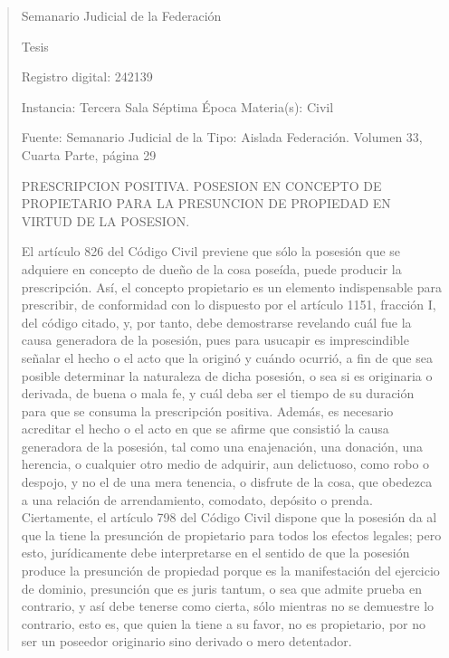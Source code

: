 \documentclass[11pt,a4paper]{article}
\begin{document}
\begin{quote}
                                                   Semanario Judicial de la Federación

                                                  Tesis

 Registro digital: 242139

 Instancia: Tercera Sala          Séptima Época                        Materia(s): Civil

                                  Fuente: Semanario Judicial de la     Tipo: Aislada
                                  Federación.
                                  Volumen 33, Cuarta Parte, página
                                  29


PRESCRIPCION POSITIVA. POSESION EN CONCEPTO DE PROPIETARIO PARA LA
PRESUNCION DE PROPIEDAD EN VIRTUD DE LA POSESION.


El artículo 826 del Código Civil previene que sólo la posesión que se adquiere en concepto de
dueño de la cosa poseída, puede producir la prescripción. Así, el concepto propietario es un
elemento indispensable para prescribir, de conformidad con lo dispuesto por el artículo 1151,
fracción I, del código citado, y, por tanto, debe demostrarse revelando cuál fue la causa generadora
de la posesión, pues para usucapir es imprescindible señalar el hecho o el acto que la originó y
cuándo ocurrió, a fin de que sea posible determinar la naturaleza de dicha posesión, o sea si es
originaria o derivada, de buena o mala fe, y cuál deba ser el tiempo de su duración para que se
consuma la prescripción positiva. Además, es necesario acreditar el hecho o el acto en que se
afirme que consistió la causa generadora de la posesión, tal como una enajenación, una donación,
una herencia, o cualquier otro medio de adquirir, aun delictuoso, como robo o despojo, y no el de
una mera tenencia, o disfrute de la cosa, que obedezca a una relación de arrendamiento, comodato,
depósito o prenda. Ciertamente, el artículo 798 del Código Civil dispone que la posesión da al que la
tiene la presunción de propietario para todos los efectos legales; pero esto, jurídicamente debe
interpretarse en el sentido de que la posesión produce la presunción de propiedad porque es la
manifestación del ejercicio de dominio, presunción que es juris tantum, o sea que admite prueba en
contrario, y así debe tenerse como cierta, sólo mientras no se demuestre lo contrario, esto es, que
quien la tiene a su favor, no es propietario, por no ser un poseedor originario sino derivado o mero
detentador.



\end{quote}
\end{document}
